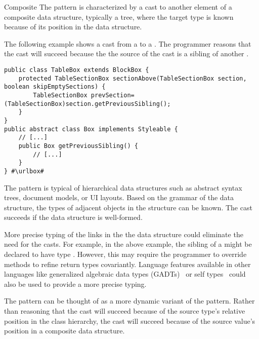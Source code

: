 \begin{pattern}{Composite}
The \thisp{} pattern is characterized by a cast to another element of a
composite data structure, typically a tree, where the target type is known because of its
position in the data structure.

\instances{}
The following example
shows a cast from a  to a .
The programmer reasons that the cast will succeed because the 
the source of the cast is a sibling of another .

\def\urlvar{http://bit.ly/flyingsaucerproject_flyingsaucer_2N2nYbY}
\begin{verbatim}
public class TableBox extends BlockBox {
    protected TableSectionBox sectionAbove(TableSectionBox section, boolean skipEmptySections) {
        TableSectionBox prevSection=(TableSectionBox)section.getPreviousSibling();
    }
}
public abstract class Box implements Styleable {
    // [...]
    public Box getPreviousSibling() {
        // [...]
    }
} #\urlbox#
\end{verbatim}

\discussion{}
The pattern is typical of hierarchical data structures such as abstract syntax
trees, document models, or UI layouts. Based on the grammar of 
the data structure, the types of adjacent objects in the structure can be known.
The cast succeeds if the data structure is well-formed.

More precise typing of the links in the the data structure could 
eliminate the need for the casts. For example, in the above example,
the sibling of a  might be declared to have type
. However, this may require the programmer to override
methods to refine return types covariantly.
Language features available in other languages like generalized algebraic data types
  (GADTs)~\cite{gadts} or self types~\cite{bruceChallengingTypingIssues2003,scalaIndependentlyExtensible} could also be 
used to provide a more precise typing.

The pattern can be thought of as a more dynamic variant of the
 pattern. Rather than
reasoning that the cast will succeed because of the source type's relative position in the 
class hierarchy, the cast will succeed because of the source value's position
in a composite data structure.

\end{pattern}
